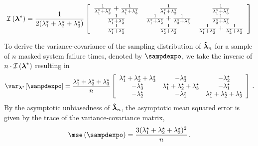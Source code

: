 \documentclass[../main.tex]{subfiles}
\begin{document}
\begin{equation}
\mathcal{I} \left ( {\boldsymbol{\lambda}}^{\star} \right ) =
\frac{1}{2({\lambda}^{\star}_1 + {\lambda}^{\star}_2 + {\lambda}^{\star}_3)}
\left[
\begin{array}{ccc}
 \frac{1}{{\lambda}^{\star}_1+{\lambda}^{\star}_2}+\frac{1}{{\lambda}^{\star}_1+{\lambda}^{\star}_3}    & \frac{1}{{\lambda}^{\star}_1+{\lambda}^{\star}_2}                                                   & \frac{1}{{\lambda}^{\star}_1+{\lambda}^{\star}_3}\\
 \frac{1}{{\lambda}^{\star}_1+{\lambda}^{\star} _2}                                                            & \frac{1}{{\lambda}^{\star}_1+{\lambda}^{\star}_2}+\frac{1}{{\lambda}^{\star}_2+{\lambda}^{\star}_3}   & \frac{1}{{\lambda}^{\star}_2+{\lambda}^{\star}_3}\\
 \frac{1}{{\lambda}^{\star}_1+{\lambda}^{\star}_3}                                                    & \frac{1}{{\lambda}^{\star}_2+{\lambda}^{\star}_3}                                                   & \frac{1}{{\lambda}^{\star}_1+{\lambda}^{\star}_3}+\frac{1}{{\lambda}^{\star}_2+{\lambda}^{\star}_3}
\end{array}
\right]
\end{equation}

To derive the variance-covariance of the sampling distribution of $\boldsymbol{\hat{\lambda}}_n$ for a sample of $n$ masked system failure times, denoted by $\sampdexpo$, we take the inverse of $n \cdot \mathcal{I} \left({\boldsymbol{\lambda}}^{\star} \right)$ resulting in
\begin{equation}
    \var_{\tparam{\vec\lambda}}\!\left[\sampdexpo\right] = \frac{\tparam{\lambda}_1+\tparam{\lambda}_2+\tparam{\lambda}_3}{n}
    \left[
        \begin{array}{ccc}
         \tparam{\lambda}_1 +  \tparam{\lambda}_2 +  \tparam{\lambda}_3 & - \tparam{\lambda}_3 & - \tparam{\lambda}_2 \\
        -\tparam{\lambda}_3 &  \tparam{\lambda}_1 +  \tparam{\lambda}_2   + \tparam{\lambda}_3 & - \tparam{\lambda}_1 \\
        -\tparam{\lambda}_2 & -\tparam{\lambda}_1  & \tparam{\lambda}_1   + \tparam{\lambda}_2   + \tparam{\lambda}_3 \\
\end{array}
\right]\,.
\end{equation}
By the asymptotic unbiasedness of $\boldsymbol{\hat{\lambda}}_n$, the asymptotic mean squared error is given by the trace of the variance-covariance matrix,
\begin{equation}
    \mse\left(\sampdexpo\right) = \frac{3(\tparam{\lambda}_1 +  \tparam{\lambda}_2 +  \tparam{\lambda}_3)^2}{n}\,.
\end{equation}
\end{document}
